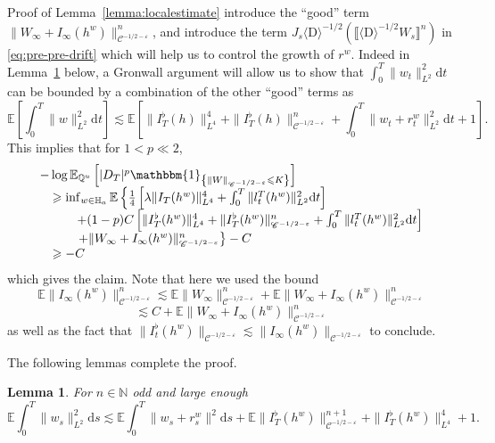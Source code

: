 \documentclass[11pt]{article}
\newcommand{\mathD}{\mathrm{D}}
\newcommand{\mathd}{\mathrm{d}}
\newenvironment{proof*}[1]{\noindent\textbf{#1\ }}{\hspace*{\fill}$\Box$\medskip}
\newtheorem{lemma}{Lemma}
\newcommand{\VV}{\mathscr{C}}
\begin{document}
\begin{proof*}{Proof of Lemma~\ref{lemma:localestimate}}
  introduce the ``good'' term $\| W_{\infty} + I_{\infty} (h^w) \|^n_{\VV^{- 1
  / 2 - \varepsilon}}$, and introduce the term $J_s \langle \mathD \rangle^{-
  1 / 2} (\llbracket \langle \mathD \rangle^{- 1 / 2} W_s \rrbracket^n)$ in
  {\eqref{eq:pre-pre-drift}} which will help us to control the growth of
  $r^w$. Indeed in Lemma~\ref{lemma:driftgronwallestimate} below, a Gronwall
  argument will allow us to show that $\int^T_0 \| w_t \|^2_{L^2} \mathd t$
  can be bounded by a combination of the other ``good'' terms as
  \[ \mathbb{E} \left[ \int^T_0 \| w \|^2_{L^2} \mathd t \right] \lesssim
     \mathbb{E} \left[ \| I^{\flat}_T (h) \|^4_{L^4} + \| I_T^{\flat} (h)
     \|^n_{\VV^{- 1 / 2 - \varepsilon}} + \int^T_0 \| w_t + r_t^w \|_{L^2}^2
     \mathd t + 1 \right] . \]
  This implies that for $1 < p \ll 2$,
  \[ \begin{array}{l}
       - \log \mathbb{E}_{\mathbb{Q}^u} \left[ | D_T |^p \mathbbm{1}_{\left\{
       \| W \|_{\VV^{- 1 / 2 - \varepsilon}} \leqslant K \right\}} \right]\\
       \quad \geqslant \inf_{w \in \mathbb{H}_a} \mathbb{E} \left\{
       \frac{1}{4} \left[ \lambda \| I_T (h^w) \|^4_{L^4} + \int^T_0 \| l^T_t
       (h^w) \|_{L^2}^2 \mathd t \right] \right.\\
       \quad \quad \quad + (1 - p) C \left[ \| I^{\flat}_T (h^w) \|^4_{L^4} +
       \| I_T^{\flat} (h^w) \|^n_{\VV^{- 1 / 2 - \varepsilon}} + \int^T_0 \|
       l^T_t (h^w) \|_{L^2}^2 \mathd t \right]\\
       \quad \quad \quad \left. + \| W_{\infty} + I_{\infty} (h^w)
       \|^n_{\VV^{- 1 / 2 - \varepsilon}} \right\} - C\\
       \quad \geqslant - C
     \end{array} \]
  which gives the claim. Note that here we used the bound
  \[ \mathbb{E} \| I_{\infty} (h^w) \|^n_{\VV^{- 1 / 2 - \varepsilon}}
     \lesssim \mathbb{E} \| W_{\infty} \|^n_{\VV^{- 1 / 2 - \varepsilon}}
     +\mathbb{E} \| W_{\infty} + I_{\infty} (h^w) \|^n_{\VV^{- 1 / 2 -
     \varepsilon}} \]
  \[ \lesssim C +\mathbb{E} \| W_{\infty} + I_{\infty} (h^w) \|^n_{\VV^{- 1 /
     2 - \varepsilon}} \]
  as well as the fact that $\| I^{\flat}_t (h^w) \|_{\VV^{- 1 / 2 -
  \varepsilon}} \lesssim \| I_{\infty} (h^w) \|_{\VV^{- 1 / 2 - \varepsilon}}$
  to conclude.
\end{proof*}

The following lemmas complete the proof.

\begin{lemma}
  \label{lemma:driftgronwallestimate}For $n \in \mathbb{N}$ odd and large
  enough
  \[ \mathbb{E} \int^T_0 \| w_s \|_{L^2}^2 \mathd s \lesssim \mathbb{E}
     \int^T_0 \| w_s + r_s^w \|^2 \mathd s +\mathbb{E} \| I_T^{\flat} (h^w)
     \|^{n + 1}_{\VV^{- 1 / 2 - \varepsilon}} + \| I^{\flat}_T (h^w)
     \|^4_{L^4} + 1. \]
\end{lemma}
\end{document}
